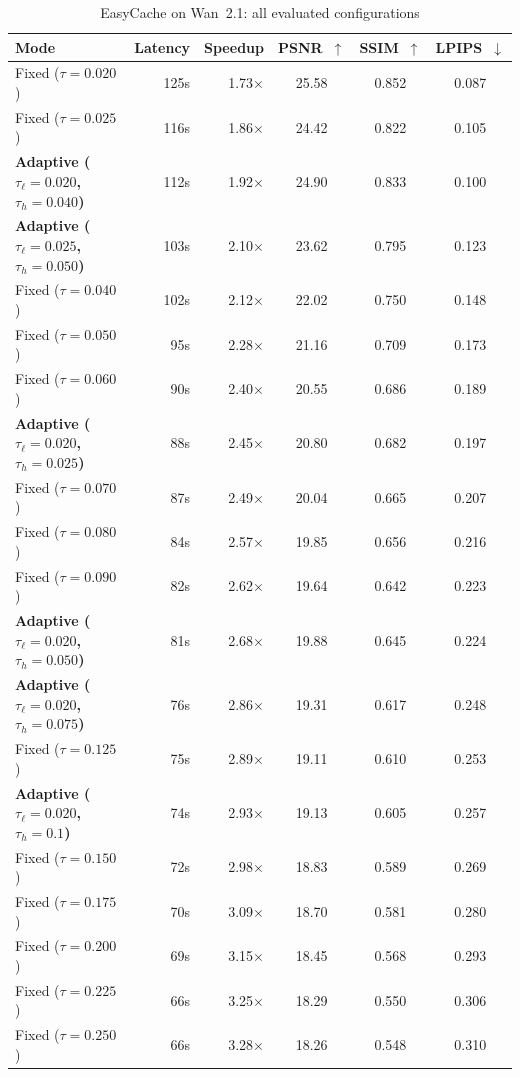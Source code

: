 \begin{table}[htbp]
\centering
\footnotesize
\setlength{\tabcolsep}{5pt}
\caption{EasyCache on Wan~2.1: all evaluated configurations}
\label{tab:app-ec-wan}
\begin{tabular}{lrrccc}
\toprule
\textbf{Mode} & \textbf{Latency} & \textbf{Speedup} & \textbf{PSNR~$\uparrow$} & \textbf{SSIM~$\uparrow$} & \textbf{LPIPS~$\downarrow$} \\
\midrule
  Fixed ($\tau=0.020$) & 125s & 1.73$\times$ & 25.58 & 0.852 & 0.087 \\
  Fixed ($\tau=0.025$) & 116s & 1.86$\times$ & 24.42 & 0.822 & 0.105 \\
  \textbf{Adaptive ($\tau_\ell=0.020$, $\tau_h=0.040$)} & 112s & 1.92$\times$ & 24.90 & 0.833 & 0.100 \\
  \textbf{Adaptive ($\tau_\ell=0.025$, $\tau_h=0.050$)} & 103s & 2.10$\times$ & 23.62 & 0.795 & 0.123 \\
  Fixed ($\tau=0.040$) & 102s & 2.12$\times$ & 22.02 & 0.750 & 0.148 \\
  Fixed ($\tau=0.050$) & 95s & 2.28$\times$ & 21.16 & 0.709 & 0.173 \\
  Fixed ($\tau=0.060$) & 90s & 2.40$\times$ & 20.55 & 0.686 & 0.189 \\
  \textbf{Adaptive ($\tau_\ell=0.020$, $\tau_h=0.025$)} & 88s & 2.45$\times$ & 20.80 & 0.682 & 0.197 \\
  Fixed ($\tau=0.070$) & 87s & 2.49$\times$ & 20.04 & 0.665 & 0.207 \\
  Fixed ($\tau=0.080$) & 84s & 2.57$\times$ & 19.85 & 0.656 & 0.216 \\
  Fixed ($\tau=0.090$) & 82s & 2.62$\times$ & 19.64 & 0.642 & 0.223 \\
  \textbf{Adaptive ($\tau_\ell=0.020$, $\tau_h=0.050$)} & 81s & 2.68$\times$ & 19.88 & 0.645 & 0.224 \\
  \textbf{Adaptive ($\tau_\ell=0.020$, $\tau_h=0.075$)} & 76s & 2.86$\times$ & 19.31 & 0.617 & 0.248 \\
  Fixed ($\tau=0.125$) & 75s & 2.89$\times$ & 19.11 & 0.610 & 0.253 \\
  \textbf{Adaptive ($\tau_\ell=0.020$, $\tau_h=0.1$)} & 74s & 2.93$\times$ & 19.13 & 0.605 & 0.257 \\
  Fixed ($\tau=0.150$) & 72s & 2.98$\times$ & 18.83 & 0.589 & 0.269 \\
  Fixed ($\tau=0.175$) & 70s & 3.09$\times$ & 18.70 & 0.581 & 0.280 \\
  Fixed ($\tau=0.200$) & 69s & 3.15$\times$ & 18.45 & 0.568 & 0.293 \\
  Fixed ($\tau=0.225$) & 66s & 3.25$\times$ & 18.29 & 0.550 & 0.306 \\
  Fixed ($\tau=0.250$) & 66s & 3.28$\times$ & 18.26 & 0.548 & 0.310 \\
\bottomrule
\end{tabular}
\end{table}

